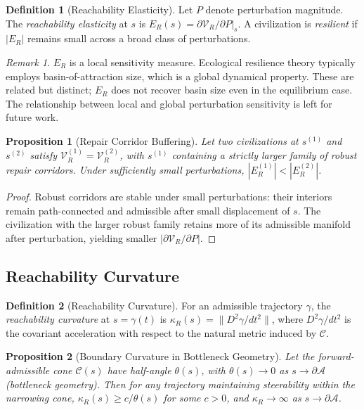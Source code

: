 \documentclass[12pt, a4paper]{article}
\theoremstyle{plain}
\newtheorem{proposition}{Proposition}
\theoremstyle{definition}
\newtheorem{definition}{Definition}
\theoremstyle{remark}
\newtheorem{remark}{Remark}
\begin{document}
\begin{definition}[Reachability Elasticity]
Let $P$ denote perturbation magnitude. The \emph{reachability elasticity} at $s$ is $E_R(s) = \partial \mathcal{V}_R/\partial P\big|_s$. A civilization is \emph{resilient} if $|E_R|$ remains small across a broad class of perturbations.
\end{definition}

\begin{remark}
$E_R$ is a local sensitivity measure. Ecological resilience theory \cite{holling1973} typically employs basin-of-attraction size, which is a global dynamical property. These are related but distinct; $E_R$ does not recover basin size even in the equilibrium case. The relationship between local and global perturbation sensitivity is left for future work.
\end{remark}

\begin{proposition}[Repair Corridor Buffering]
\label{prop:buffering}
Let two civilizations at $s^{(1)}$ and $s^{(2)}$ satisfy $\mathcal{V}_R^{(1)} = \mathcal{V}_R^{(2)}$, with $s^{(1)}$ containing a strictly larger family of robust repair corridors. Under sufficiently small perturbations, $|E_R^{(1)}| < |E_R^{(2)}|$.
\end{proposition}

\begin{proof}
Robust corridors are stable under small perturbations: their interiors remain path-connected and admissible after small displacement of $s$. The civilization with the larger robust family retains more of its admissible manifold after perturbation, yielding smaller $|\partial \mathcal{V}_R / \partial P|$.
\end{proof}

\subsection{Reachability Curvature}

\begin{definition}[Reachability Curvature]
For an admissible trajectory $\gamma$, the \emph{reachability curvature} at $s = \gamma(t)$ is $\kappa_R(s) = \|D^2\gamma/dt^2\|$, where $D^2\gamma/dt^2$ is the covariant acceleration with respect to the natural metric induced by $\mathcal{C}$.
\end{definition}

\begin{proposition}[Boundary Curvature in Bottleneck Geometry]
\label{prop:curvature}
Let the forward-admissible cone $\mathcal{C}(s)$ have half-angle $\theta(s)$, with $\theta(s) \to 0$ as $s \to \partial\mathcal{A}$ (bottleneck geometry). Then for any trajectory maintaining steerability within the narrowing cone, $\kappa_R(s) \geq c/\theta(s)$ for some $c > 0$, and $\kappa_R \to \infty$ as $s \to \partial\mathcal{A}$.
\end{proposition}
\end{document}
